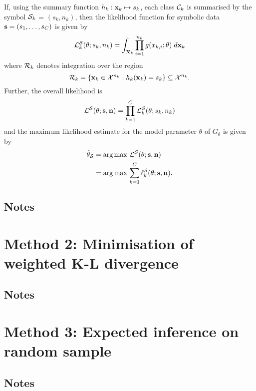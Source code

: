 \documentclass[11pt,paper=a4,numbers=noendperiod]{scrartcl} %
\begin{document}
If, using the summary function $h_k: \mathbf{x}_k \mapsto s_k$, each class
$\mathcal{C}_k$ is summarised by the symbol $\mathcal{S}_k$ = $(s_k, n_k)$,
then the likelihood function for symbolic data $\mathbf{s} = (s_1, \ldots, s_C)$
is given by
\begin{equation}
    \mathcal{L}^{\mathcal{S}}_k(\theta; s_k, n_k)
    = \int_{\mathcal{R}_k} \prod_{i=1}^{n_k} {g(x_{k,i}; \theta)}
    \; d\mathbf{x}_k
    \label{eq:symbolic-class-ll-summary-fn}
\end{equation}
where $\mathcal{R}_k$ denotes integration over the region 
\begin{equation*}
    \mathcal{R}_k = \left\{
        \mathbf{x}_k \in \mathcal{X}^{n_k}: h_k(\mathbf{x}_k) = s_k
            \right\} \subseteq \mathcal{X}^{n_k}.
\end{equation*}
Further, the overall likelihood is
\begin{equation*}
    \mathcal{L}^{\mathcal{S}}(\theta; \mathbf{s}, \mathbf{n})
        = \prod_{k=1}^C \mathcal{L}^{\mathcal{S}}_k(\theta; s_k, n_k)
\end{equation*}
and the maximum likelihood estimate for the model parameter $\theta$ of
$G_\theta$ is given by
\begin{align}
    \hat{\theta}_{\mathcal{S}}
    &= \operatorname*{\arg\max} \, \mathcal{L}^{\mathcal{S}}(\theta; \mathbf{s}, \mathbf{n}) \\
    &= \operatorname*{\arg\max} \, \sum_{k=1}^C \ell_k^{\mathcal{S}}(\theta; \mathbf{s}, \mathbf{n}).
\end{align}
\subsection{Notes}

\section{Method 2: Minimisation of weighted K-L divergence}
\subsection{Notes}

\section{Method 3: Expected inference on random sample}
\subsection{Notes}
\end{document}
